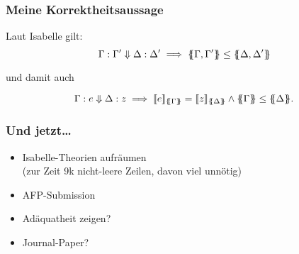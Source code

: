 \documentclass{beamer}
\begin{document}
\begin{frame}
\frametitle{Meine Korrektheitsaussage}

Laut Isabelle gilt:
\[
\sred{\Gamma}{\Gamma'}{\Delta}{\Delta'} \implies \esem{\Gamma, \Gamma'} \le \esem{\Delta, \Delta'}
\]

und damit auch

\[
\sred \Gamma  e \Delta z \implies \dsem{e}{\esem{\Gamma}} = \dsem{z}{\esem{\Delta}} \wedge {\esem{\Gamma}} \le \esem{\Delta}.
\]

\end{frame}


\begin{frame}
\frametitle{Und jetzt\dots}

\begin{itemize}
\item Isabelle-Theorien aufräumen\\{\small(zur Zeit 9k nicht-leere Zeilen, davon viel unnötig)}
\item AFP-Submission
\item Adäquatheit zeigen?
\item Journal-Paper?
\end{itemize}
\end{frame}
\end{document}

